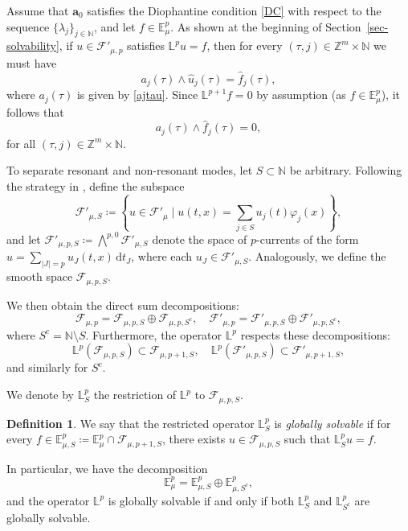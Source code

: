 \documentclass[12pt,reqno]{amsart}
\theoremstyle{definition}
\newtheorem{definition}[theorem]{Definition}
\numberwithin{equation}{section}
\begin{document}
Assume that $\boldsymbol{a}_0$ satisfies the Diophantine condition \eqref{DC} with respect to the sequence $\{\lambda_j\}_{j \in \mathbb{N}}$, and let $f \in \mathbb{E}_\mu^p$. As shown at the beginning of Section~\ref{sec-solvability}, if $u \in \mathscr{F}'_{\mu,p}$ satisfies $\mathbb{L}^p u = f$, then for every $(\tau, j) \in \mathbb{Z}^m \times \mathbb{N}$ we must have
\[
a_j(\tau) \wedge \widehat{u}_j(\tau) = \widehat{f}_j(\tau),
\]
where $a_j(\tau)$ is given by \eqref{ajtau}. Since $\mathbb{L}^{p+1} f = 0$ by assumption (as $f \in \mathbb{E}^p_\mu$), it follows that
\[
a_j(\tau) \wedge \widehat{f}_j(\tau) = 0, 
\]
for all \((\tau, j) \in \mathbb{Z}^m \times \mathbb{N}.\)

To separate resonant and non-resonant modes, let $S \subset \mathbb{N}$ be arbitrary. Following the strategy in \cite[Section 4]{BerCorPet96}, define the subspace
\[
\mathscr{F}'_{\mu,S} \coloneqq \left\{ u \in \mathscr{F}'_{\mu} \mid u(t,x) = \sum_{j \in S} u_j(t) \varphi_j(x) \right\},
\]
and let $\mathscr{F}'_{\mu,p,S} \coloneqq \textstyle\bigwedge^{p,0} \mathscr{F}'_{\mu,S}$ denote the space of $p$-currents of the form $u = \sum_{|J| = p} u_J(t,x) \, \mathrm{d}t_J$, where each $u_J \in \mathscr{F}'_{\mu,S}$. Analogously, we define the smooth space $\mathscr{F}_{\mu,p,S}$.

We then obtain the direct sum decompositions:
\[
\mathscr{F}_{\mu,p} = \mathscr{F}_{\mu,p,S} \oplus \mathscr{F}_{\mu,p,S^c}, \quad \mathscr{F}'_{\mu,p} = \mathscr{F}'_{\mu,p,S} \oplus \mathscr{F}'_{\mu,p,S^c},
\]
where $S^c = \mathbb{N} \setminus S$. Furthermore, the operator $\mathbb{L}^p$ respects these decompositions:
\[
\mathbb{L}^p(\mathscr{F}_{\mu,p,S}) \subset \mathscr{F}_{\mu,p+1,S}, \quad \mathbb{L}^p(\mathscr{F}'_{\mu,p,S}) \subset \mathscr{F}'_{\mu,p+1,S},
\]
and similarly for $S^c$.

We denote by $\mathbb{L}^p_S$ the restriction of $\mathbb{L}^p$ to $\mathscr{F}_{\mu,p,S}$.

\begin{definition}
	We say that the restricted operator $\mathbb{L}^p_S$ is \emph{globally solvable} if for every $f \in \mathbb{E}^p_{\mu,S} \coloneqq \mathbb{E}^p_\mu \cap \mathscr{F}_{\mu,p+1,S}$, there exists $u \in \mathscr{F}_{\mu,p,S}$ such that $\mathbb{L}^p_S u = f$.
\end{definition}

In particular, we have the decomposition
\[
\mathbb{E}^p_\mu = \mathbb{E}^p_{\mu,S} \oplus \mathbb{E}^p_{\mu,S^c},
\]
and the operator $\mathbb{L}^p$ is globally solvable if and only if both $\mathbb{L}^p_S$ and $\mathbb{L}^p_{S^c}$ are globally solvable.
\end{document}
